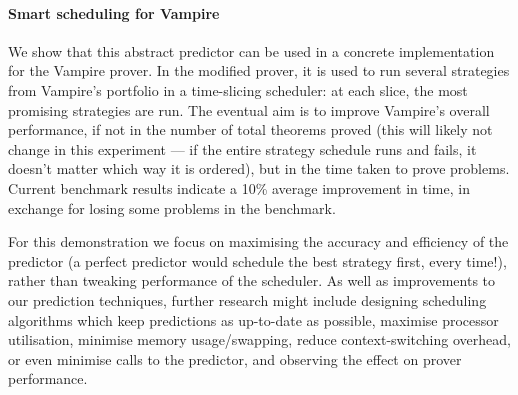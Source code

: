 \documentclass{easychair}
\begin{document}
\paragraph{Smart scheduling for Vampire}
We show that this abstract predictor can be used in a concrete implementation for the Vampire prover.
In the modified prover, it is used to run several strategies from Vampire's portfolio in a time-slicing scheduler: at each slice, the most promising strategies are run.
The eventual aim is to improve Vampire's overall performance, if not in the number of total theorems proved (this will likely not change in this experiment --- if the entire strategy schedule runs and fails, it doesn't matter which way it is ordered), but in the time taken to prove problems.
Current benchmark results indicate a 10\% average improvement in time, in exchange for losing some problems in the benchmark.

For this demonstration we focus on maximising the accuracy and efficiency of the predictor (a perfect predictor would schedule the best strategy first, every time!), rather than tweaking performance of the scheduler.
As well as improvements to our prediction techniques, further research might include designing scheduling algorithms which keep predictions as up-to-date as possible, maximise processor utilisation, minimise memory usage/swapping, reduce context-switching overhead, or even minimise calls to the predictor, and observing the effect on prover performance.



\end{document}
